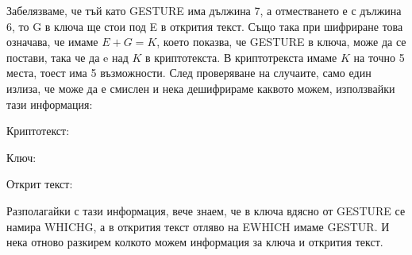\documentclass{article}
\begin{document}
\justify
Забелязваме, че тъй като GESTURE има дължина 7, а отместването е с дължина 6, то G в ключа ще стои под E в открития текст. Също така при шифриране това означава, че имаме $E + G = K$, което показва, че GESTURE в ключа, може да се постави, така че да e над $K$ в криптотекста. В криптотрекста имаме $K$ на точно 5 места, тоест има 5 възможности. След проверяване на случаите, само един излиза, че може да е смислен и нека дешифрираме каквото можем, използвайки тази информация:

\justify
Криптотекст:
\begin{center}
\end{center}

\justify
Ключ:
\begin{center}
\end{center}

\justify
Открит текст:
\begin{center}
\end{center}

\justify
Разполагайки с тази информация, вече знаем, че в ключа вдясно от GESTURE се намира WHICHG, а в открития текст отляво на EWHICH имаме GESTUR. И нека отново разкирем колкото можем информация за ключа и открития текст.
\end{document}
